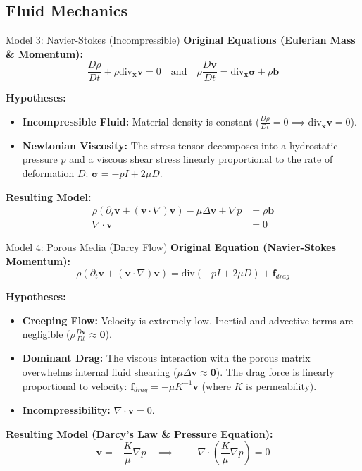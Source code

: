 \documentclass[aspectratio=169]{beamer}
\begin{document}
\subsection{Fluid Mechanics}

\begin{frame}{Model 3: Navier-Stokes (Incompressible)}
    \textbf{Original Equations (Eulerian Mass \& Momentum):}
    $$ \frac{D\rho}{Dt} + \rho \text{div}_{\bm{x}} \bm{v} = 0 \quad \text{and} \quad \rho \frac{D\bm{v}}{Dt} = \text{div}_{\bm{x}} \bm{\sigma} + \rho \bm{b} $$

    \textbf{Hypotheses:}
    \begin{itemize}
        \item \textbf{Incompressible Fluid:} Material density is constant ($\frac{D\rho}{Dt} = 0 \implies \text{div}_{\bm{x}} \bm{v} = 0$).
        \item \textbf{Newtonian Viscosity:} The stress tensor decomposes into a hydrostatic pressure $p$ and a viscous shear stress linearly proportional to the rate of deformation $D$: $\bm{\sigma} = -p I + 2\mu D$.
    \end{itemize}

    \textbf{Resulting Model:}
    \begin{align*}
        \rho (\partial_t \bm{v} + (\bm{v} \cdot \nabla) \bm{v}) - \mu \Delta \bm{v} + \nabla p &= \rho \bm{b} \\
        \nabla \cdot \bm{v} &= 0
    \end{align*}
\end{frame}

\begin{frame}{Model 4: Porous Media (Darcy Flow)}
    \textbf{Original Equation (Navier-Stokes Momentum):}
    $$ \rho (\partial_t \bm{v} + (\bm{v} \cdot \nabla) \bm{v}) = \text{div} (-pI + 2\mu D) + \bm{f}_{drag} $$

    \textbf{Hypotheses:}
    \begin{itemize}
        \item \textbf{Creeping Flow:} Velocity is extremely low. Inertial and advective terms are negligible ($\rho \frac{D\bm{v}}{Dt} \approx \bm{0}$).
        \item \textbf{Dominant Drag:} The viscous interaction with the porous matrix overwhelms internal fluid shearing ($\mu \Delta \bm{v} \approx \bm{0}$). The drag force is linearly proportional to velocity: $\bm{f}_{drag} = - \mu K^{-1} \bm{v}$ (where $K$ is permeability).
        \item \textbf{Incompressibility:} $\nabla \cdot \bm{v} = 0$.
    \end{itemize}

    \textbf{Resulting Model (Darcy's Law \& Pressure Equation):}
    $$ \bm{v} = -\frac{K}{\mu} \nabla p \quad \implies \quad - \nabla \cdot \left( \frac{K}{\mu} \nabla p \right) = 0 $$
\end{frame}
\end{document}

